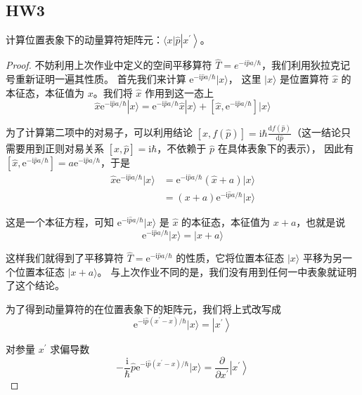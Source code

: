 \subsection{HW3}
\begin{1}
计算位置表象下的动量算符矩阵元：$\langle x| \hat{p}\left|x^{\prime}\right\rangle$。
\end{1}
\begin{proof}
    不妨利用上次作业中定义的空间平移算符 $\hat{T}=e^{-i \hat{p} a / \hbar}$，我们利用狄拉克记号重新证明一遍其性质。
    首先我们来计算 $\mathrm{e}^{-\mathrm{i} \hat{p} a / \hbar}|x\rangle$，
    这里 $|x\rangle$ 是位置算符 $\hat{x}$ 的本征态，本征值为 $x$。我们将 $\hat{x}$ 作用到这一态上
$$\hat{x} \mathrm{e}^{-\mathrm{i} \hat{p} a / \hbar}|x\rangle
=\mathrm{e}^{-\mathrm{i} \hat{p} a / \hbar} \hat{x}|x\rangle
+\left[\hat{x}, \mathrm{e}^{-\mathrm{i} \hat{p} a / \hbar}\right]|x\rangle$$

为了计算第二项中的对易子，可以利用结论 $[\hat{x}, f(\hat{p})]=\mathrm{i} \hbar \frac{\mathrm{d} f(\hat{p})}{\mathrm{d} \hat{p}}$（这一结论只需要用到正则对易关系 $[\hat{x}, \hat{p}]=\mathrm{i} \hbar$，不依赖于 $\hat{p}$ 在具体表象下的表示），
因此有 $\left[\hat{x}, \mathrm{e}^{-\mathrm{i} \hat{p} a / \hbar}\right]=a \mathrm{e}^{-\mathrm{i} \hat{p} a / \hbar}$，于是
$$
\begin{aligned}
\hat{x} \mathrm{e}^{-\mathrm{i} \hat{p} a / \hbar}|x\rangle & =\mathrm{e}^{-\mathrm{i} \hat{p} a / \hbar}(\hat{x}+a)|x\rangle \\
& =(x+a) \mathrm{e}^{-\mathrm{i} \hat{p} a / \hbar}|x\rangle
\end{aligned}
$$

这是一个本征方程，可知 $\mathrm{e}^{-\mathrm{i} \hat{p} a / \hbar}|x\rangle$ 是 $\hat{x}$ 的本征态，本征值为 $x+a$，也就是说
$$\mathrm{e}^{-\mathrm{i} \hat{p} a / \hbar}|x\rangle=|x+a\rangle$$

这样我们就得到了平移算符 $\hat{T}=\mathrm{e}^{-\mathrm{i} \hat{p} a / \hbar}$ 的性质，它将位置本征态 $|x\rangle$ 平移为另一个位置本征态 $|x+a\rangle$。
与上次作业不同的是，我们没有用到任何一中表象就证明了这个结论。

为了得到动量算符的在位置表象下的矩阵元，我们将上式改写成
$$\mathrm{e}^{-\mathrm{i} \hat{p}\left(x^{\prime}-x\right) / \hbar}|x\rangle
=\left|x^{\prime}\right\rangle$$

对参量 $x^{\prime}$ 求偏导数
$$-\frac{\mathrm{i}}{\hbar} \hat{p} \mathrm{e}^{-\mathrm{i} \hat{p}\left(x^{\prime}-x\right) / \hbar}|x\rangle
=\frac{\partial}{\partial x^{\prime}}\left|x^{\prime}\right\rangle$$


\end{proof}
